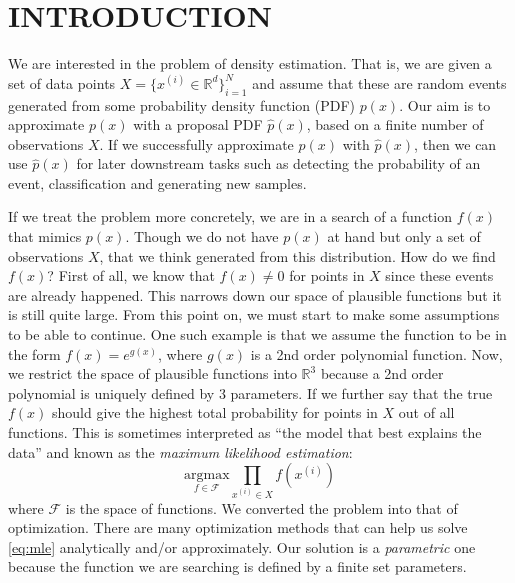 \documentclass[a4paper,onesided,12pt]{report}
\begin{document}
\begin{abbreviations}
\end{abbreviations}


\chapter{INTRODUCTION}
\label{chapter:intro}

We are interested in the problem of density estimation. That is, we are given a set of data points $X = \{x^{(i)} \in \mathbb{R}^d\}_{i=1}^N$ and assume that these are random events generated from some probability density function (PDF) $p(x)$. Our aim is to approximate $p(x)$ with a proposal PDF $\hat{p}(x)$, based on a finite number of observations $X$. If we successfully approximate $p(x)$ with $\hat{p}(x)$, then we can use $\hat{p}(x)$ for later downstream tasks such as detecting the probability of an event, classification and generating new samples.

If we treat the problem more concretely, we are in a search of a function $f(x)$ that mimics $p(x)$. Though we do not have $p(x)$ at hand but only a set of observations $X$, that we think generated from this distribution. How do we find $f(x)$? First of all, we know that $f(x) \neq 0$ for points in $X$ since these events are already happened. This narrows down our space of plausible functions but it is still quite large. From this point on, we must start to make some assumptions to be able to continue. One such example is that we assume the function to be in the form $f(x)=e^{g(x)}$, where $g(x)$ is a 2nd order polynomial function. Now, we restrict the space of plausible functions into $\mathbb{R}^3$ because a 2nd order polynomial is uniquely defined by 3 parameters. If we further say that the true $f(x)$ should give the highest total probability for points in $X$ out of all functions. This is sometimes interpreted as ``the model that best explains the data'' and known as the \emph{maximum likelihood estimation}:
\begin{equation}
\underset{f \in \mathcal{F}}{\text{argmax}} \prod_{x^{(i)} \in X} f(x^{(i)}) 
\label{eq:mle}
\end{equation}
where $\mathcal{F}$ is the space of functions. We converted the problem into that of optimization. There are many optimization methods that can help us solve \ref{eq:mle} analytically and/or approximately. Our solution is a \emph{parametric} one because the function we are searching is defined by a finite set parameters.
\end{document}
